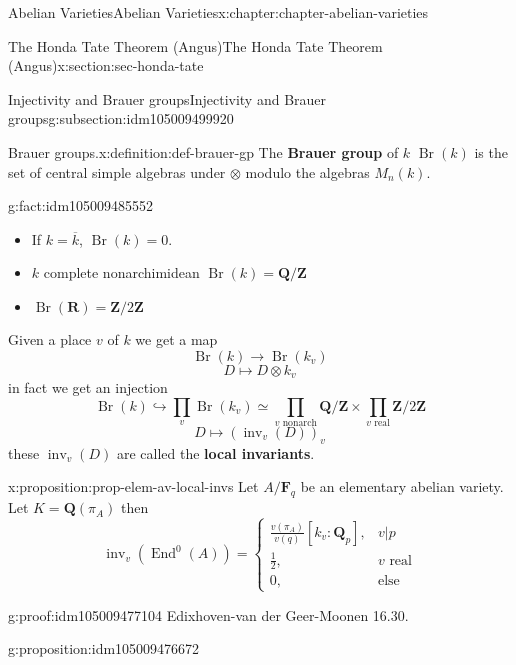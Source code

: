 \documentclass[oneside,10pt,]{book}
\newcommand{\terminology}[1]{\textbf{#1}}
\numberwithin{equation}{section}
\newcommand{\ZZ}{\mathbf{Z}}
\newcommand{\QQ}{\mathbf{Q}}
\newcommand{\RR}{\mathbf{R}}
\newcommand{\FF}{\mathbf{F}}
\DeclareMathOperator{\End}{End}
\newcommand{\amp}{&}
\begin{document}
\begin{chapterptx}{Abelian Varieties}{}{Abelian Varieties}{}{}{x:chapter:chapter-abelian-varieties}
\begin{sectionptx}{The Honda Tate Theorem (Angus)}{}{The Honda Tate Theorem (Angus)}{}{}{x:section:sec-honda-tate}
\begin{subsectionptx}{Injectivity and Brauer groups}{}{Injectivity and Brauer groups}{}{}{g:subsection:idm105009499920}
\begin{definition}{Brauer groups.}{x:definition:def-brauer-gp}
The \terminology{Brauer group} of \(k\) \(\operatorname{Br}(k)\) is the set of central simple algebras under \(\otimes\) modulo the algebras \(M_n(k)\).%
\end{definition}
\begin{fact}{}{}{g:fact:idm105009485552}%
%
\begin{itemize}[label=\textbullet]
\item{}If \(k = \overline k\), \(\operatorname{Br}(k) = 0\).%
\item{}\(k\) complete nonarchimidean \(\operatorname{Br}(k) = \QQ/\ZZ\)%
\item{}\(\displaystyle \operatorname{Br}(\RR) = \ZZ/2\ZZ\)%
\end{itemize}
Given a place \(v\) of \(k\) we get a map%
\begin{equation*}
\operatorname{Br}(k) \to \operatorname{Br}(k_v)
\end{equation*}
%
\begin{equation*}
D \mapsto D\otimes k_v
\end{equation*}
in fact we get an injection%
\begin{equation*}
\operatorname{Br}(k) \hookrightarrow \prod_v \operatorname{Br}(k_v) \simeq \prod_{v\text{ nonarch}} \QQ/\ZZ \times \prod_{v\text{ real}} \ZZ/2\ZZ
\end{equation*}
%
\begin{equation*}
D\mapsto (\operatorname{inv}_v(D))_v
\end{equation*}
these \(\operatorname{inv}_v(D)\) are called the \terminology{local invariants}.%
\end{fact}
\begin{proposition}{}{}{x:proposition:prop-elem-av-local-invs}%
Let \(A/\FF_q\) be an elementary abelian variety. Let \(K = \QQ(\pi_A)\) then%
\begin{equation*}
\operatorname{inv}_v(\End^0(A)) = \begin{cases} \frac{v(\pi_A)}{v(q)} [k_v: \QQ_p], \amp v|p\\ \frac 12,\amp v\text{ real}\\ 0, \amp \text{else}\end{cases}
\end{equation*}
%
\end{proposition}
\begin{proofptx}{}{g:proof:idm105009477104}
Edixhoven-van der Geer-Moonen 16.30.%
\end{proofptx}
\begin{proposition}{}{}{g:proposition:idm105009476672}%

\end{proposition}
\end{subsectionptx}
\end{sectionptx}
\end{chapterptx}
\end{document}

